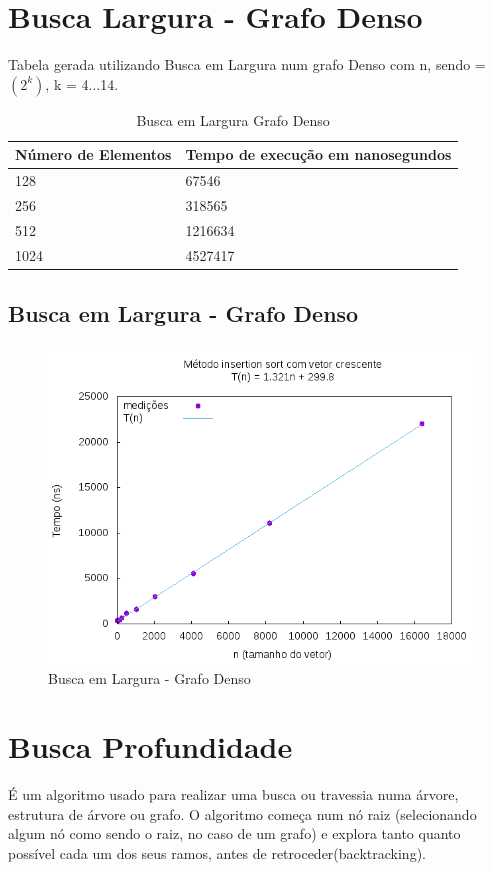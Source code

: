 \documentclass[12pt,a4paper,twoside]{report}
\begin{document}
\section{Busca Largura - Grafo Denso}
Tabela gerada utilizando Busca em Largura num grafo Denso com n, sendo = $(2^k)$, k = 4...14.

\begin{table}[H]
\centering
\caption{Busca em Largura Grafo Denso}
\label{my-label}
\begin{tabular}{|l|l|}
\hline
\multicolumn{1}{|c|}{\textbf{Número de Elementos}} & \multicolumn{1}{c|}{\textbf{Tempo de execução em nanosegundos}} \\ \hline
128 & 67546 \\ \hline
256 & 318565 \\ \hline
512 & 1216634 \\ \hline
1024 & 4527417 \\ \hline
\end{tabular}
\end{table}

\subsection{Busca em Largura - Grafo Denso}
\begin{figure}[H]
    \centering
    \includegraphics[width=0.7\linewidth]{graficos/Insertion/vIntCrescente/vIntCrescente.png}
  \caption{Busca em Largura - Grafo Denso}
\end{figure}

\section{Busca Profundidade}
É um algoritmo usado para realizar uma busca ou travessia numa árvore, estrutura de árvore ou grafo. O algoritmo começa num nó raiz (selecionando algum nó como sendo o raiz, no caso de um grafo) e explora tanto quanto possível cada um dos seus ramos, antes de retroceder(backtracking).
\end{document}
